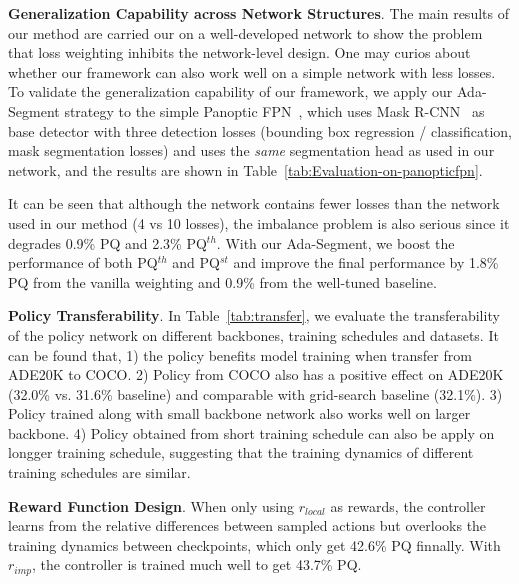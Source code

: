 \documentclass[letterpaper]{article} \usepackage{aaai21}  \usepackage{times}  \usepackage{helvet} \usepackage{courier}  \usepackage[hyphens]{url}  \usepackage{graphicx} \urlstyle{rm} \def\UrlFont{\rm}  \usepackage{natbib}  \usepackage{caption} \frenchspacing  \setlength{\pdfpagewidth}{8.5in}  \setlength{\pdfpageheight}{11in}
\begin{document}
 \noindent
 \textbf{Generalization Capability across Network Structures}. 
 The main results of our method are carried our on a well-developed network to show the problem
 that loss weighting inhibits the network-level design. 
 One may curios about whether our framework can also work well on a simple network with less losses.
 To validate the generalization capability of our framework, 
 we apply our Ada-Segment strategy to the simple Panoptic FPN~\cite{panopticFPNkirillov2019},
 which uses Mask R-CNN~\cite{he2017mask} as base detector with three detection losses 
 (bounding box regression / classification, mask segmentation losses) and uses the \textit{same}
 segmentation head as used in our network, 
 and the results are shown in Table~\ref{tab:Evaluation-on-panopticfpn}.


It can be seen that although the network contains fewer losses than the network used 
 in our method (4 vs 10 losses), the imbalance problem is also serious since it degrades 0.9\% PQ 
 and 2.3\% PQ$^{th}$. 
 With our Ada-Segment, we boost the performance of both PQ$^{th}$ and PQ$^{st}$ 
 and improve the final performance by 1.8\% PQ from the vanilla weighting and 0.9\% from the well-tuned baseline. 




 \noindent
 \textbf{Policy Transferability}.  
In Table~\ref{tab:transfer}, we evaluate the transferability of the policy network
 on different backbones, training schedules and datasets.
It can be found that, 
 1) the policy benefits model training when transfer from ADE20K to COCO.
2) Policy from COCO also has a positive effect on ADE20K (32.0\% vs. 31.6\% baseline) and 
 comparable with grid-search baseline (32.1\%). 
3) Policy trained along with small backbone network also works well on larger backbone.
 4) Policy obtained from short training schedule can also be apply on longger training schedule, suggesting
 that the training dynamics of different training schedules are similar. 


 \noindent
 \textbf{Reward Function Design}.
When only using $r_{local}$ as rewards, the controller learns from the relative differences between 
 sampled actions but overlooks the training dynamics between checkpoints, which only get 
 42.6\% PQ finnally.
 With $r_{imp}$, the controller is trained much well to get 43.7\% PQ. 
\end{document}
